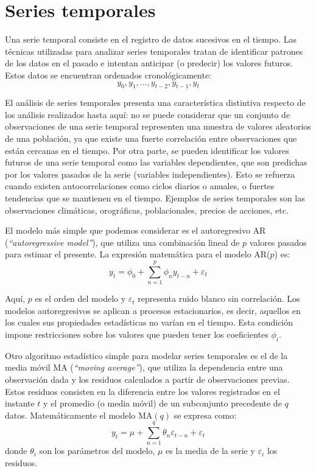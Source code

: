 \section{Series temporales}

Una serie temporal consiste en el registro de datos sucesivos en el tiempo. Las técnicas utilizadas para analizar series temporales tratan de identificar patrones de los datos en el pasado e intentan anticipar (o predecir) los valores futuros. Estos datos se encuentran ordenados cronológicamente:
\[ y_0, y_1, \ldots, y_{t-2}, y_{t-1}, y_{t} \]

El análisis de series temporales presenta una característica distintiva respecto de los análisis realizados hasta aquí: no se puede considerar que un conjunto de observaciones de una serie temporal representen una muestra de valores aleatorios de una población, ya que existe una fuerte correlación entre observaciones que están cercanas en el tiempo. Por otra parte, se pueden identificar los valores futuros de una serie temporal como las variables dependientes, que son predichas por los valores pasados de la serie (variables independientes). Esto se refuerza cuando existen autocorrelaciones como ciclos diarios o anuales, o fuertes tendencias que se mantienen en el tiempo. Ejemplos de series temporales son las observaciones climáticas, orográficas, poblacionales, precios de acciones, etc.

El modelo más simple que podemos considerar es el autoregresivo AR (\textit{``autoregressive model''}), que utiliza una combinación lineal de $p$ valores pasados para estimar el presente. La expresión matemática para el modelo AR($p$) es:
\[ y_t = \phi_0 + \sum_{n=1}^p {\phi_n y_{t-n}} + \varepsilon_t \]

Aquí, $p$ es el orden del modelo y $\varepsilon_t$ representa ruido blanco sin correlación. Los modelos autoregresivos se aplican a procesos estacionarios, es decir, aquellos en los cuales sus propiedades estadísticas no varían en el tiempo. Esta condición impone restricciones sobre los valores que pueden tener los coeficientes $\phi_i$.

Otro algoritmo estadístico simple para modelar series temporales es el de la media móvil MA (\textit{``moving average''}), que utiliza la dependencia entre una observación dada y los residuos calculados a partir de observaciones previas. Estos residuos consisten en la diferencia entre los valores registrados en el instante $t$ y el promedio (o media móvil) de un subconjunto precedente de $q$ datos. Matemáticamente el modelo MA$(q)$ se expresa como:
\[ y_t = \mu + \sum_{n=1}^q {\theta_n \varepsilon_{t-n}} + \varepsilon_t \]
donde $\theta_i$ son los parámetros del modelo, $\mu$ es la media de la serie y $\varepsilon_i$ los residuos.


